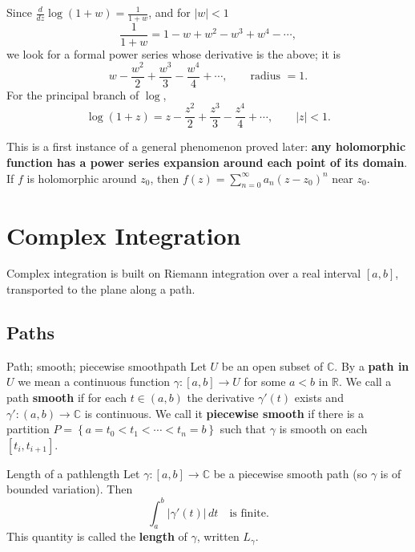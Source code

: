 \documentclass[11pt,openany]{report}
\newcommand{\C}{\mathbb{C}}
\newcommand{\R}{\mathbb{R}}
\newcommand{\abs}[1]{\left\lvert #1 \right\rvert}
\newcommand{\set}[1]{\left\{ #1 \right\}}
\begin{document}
Since $\frac{d}{dz}\log(1+w)=\frac{1}{1+w}$, and for $\abs{w}<1$
\[
  \frac{1}{1+w} = 1 - w + w^2 - w^3 + w^4 - \cdots,
\]
we look for a formal power series whose derivative is the above; it is
\[
  w - \frac{w^2}{2} + \frac{w^3}{3} - \frac{w^4}{4} + \cdots, \qquad \text{radius } = 1.
\]
For the principal branch of $\log$,
\[
  \boxed{\ \log(1+z) = z - \frac{z^2}{2} + \frac{z^3}{3} - \frac{z^4}{4} + \cdots,
  \qquad \abs{z}<1.\ }
\]

\begin{remark}
This is a first instance of a general phenomenon proved later: \textbf{any holomorphic
function has a power series expansion around each point of its domain}. If $f$ is
holomorphic around $z_0$, then $f(z)=\sum_{n=0}^{\infty}a_n(z-z_0)^n$ near $z_0$.
\end{remark}


\chapter{Complex Integration}

Complex integration is built on Riemann integration over a real interval $[a,b]$,
transported to the plane along a path.

\section{Paths}

\begin{definition}{Path; smooth; piecewise smooth}{path}
Let $U$ be an open subset of $\C$. By a \textbf{path in $U$} we mean a continuous function
$\gamma:[a,b]\to U$ for some $a<b$ in $\R$. We call a path \textbf{smooth} if for each
$t\in(a,b)$ the derivative $\gamma'(t)$ exists and $\gamma':(a,b)\to\C$ is continuous. We
call it \textbf{piecewise smooth} if there is a partition
$P=\set{ a=t_0<t_1<\cdots<t_n=b }$ such that $\gamma$ is smooth on each $[t_i,t_{i+1}]$.
\end{definition}

\begin{theorem}{Length of a path}{length}
Let $\gamma:[a,b]\to\C$ be a piecewise smooth path (so $\gamma$ is of bounded variation).
Then
\[
  \int_a^b \abs{\gamma'(t)}\,dt \quad\text{is finite.}
\]
This quantity is called the \textbf{length} of $\gamma$, written $L_\gamma$.
\end{theorem}
\end{document}
